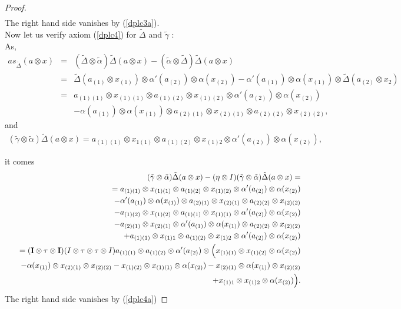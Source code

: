 \documentclass{article}
\theoremstyle{definition}
\theoremstyle{remark}
\numberwithin{equation}{section}
\begin{document}
\begin{proof}
\begin{eqnarray}
\end{eqnarray}
The right hand side vanishes by (\ref{dplc3a}).\\
Now let us verify axiom (\ref{dplc4}) for $\tilde\Delta$ and $\tilde\gamma$ :\\
As,
\begin{eqnarray}
 as_{\tilde\Delta}(a\otimes x)
&=&(\tilde\Delta\otimes \tilde\alpha)\tilde\Delta(a\otimes x)-(\tilde\alpha\otimes\tilde\Delta)\tilde\Delta(a\otimes x)\nonumber\\
&=&\tilde\Delta(a_{(1)}\otimes x_{(1)})\otimes \alpha'(a_{(2)})\otimes \alpha(x_{(2)})-\alpha'(a_{(1)})\otimes \alpha(x_{(1)})\otimes\tilde\Delta(a_{(2)}\otimes x_{2})\nonumber\\
&=&a_{(1)(1)}\otimes x_{(1)(1)}\otimes a_{(1)(2)}\otimes x_{(1)(2)}\otimes\alpha'(a_{(2)})\otimes \alpha(x_{(2)})\nonumber\\
&&-\alpha(a_{(1)})\otimes\alpha(x_{(1)})\otimes a_{(2)(1)}\otimes x_{(2)(1)}\otimes a_{(2)(2)}\otimes x_{(2)(2)}\nonumber,
\end{eqnarray}
and
\begin{eqnarray}
 (\tilde\gamma\otimes \tilde\alpha)\tilde\Delta(a\otimes x)
=a_{(1)(1)}\otimes x_{1(1)}\otimes a_{(1)(2)}\otimes x_{(1)2}\otimes\alpha'(a_{(2)})\otimes \alpha(x_{(2)}),\nonumber
\end{eqnarray}

it comes
\begin{eqnarray}
 &&\qquad(\tilde\gamma\otimes \tilde\alpha)\tilde\Delta(a\otimes x)-(\eta\otimes I)(\tilde\gamma\otimes \tilde\alpha)\tilde\Delta(a\otimes x)=\nonumber\\
&&=a_{(1)(1)}\otimes x_{(1)(1)}\otimes a_{(1)(2)}\otimes x_{(1)(2)}\otimes \alpha'(a_{(2)})\otimes \alpha(x_{(2)})\nonumber\\
&&\quad\quad-\alpha'(a_{(1)})\otimes \alpha(x_{(1)})\otimes a_{(2)(1)}\otimes x_{(2)(1)}\otimes a_{(2)(2)}\otimes x_{(2)(2)}\nonumber\\
&&\quad-a_{(1)(2)}\otimes x_{(1)(2)}\otimes a_{(1)(1)}\otimes x_{(1)(1)}\otimes \alpha'(a_{(2)})\otimes \alpha(x_{(2)})\nonumber\\
&&\quad\quad-a_{(2)(1)}\otimes x_{(2)(1)}\otimes \alpha'(a_{(1)})\otimes \alpha(x_{(1)})\otimes a_{(2)(2)}\otimes x_{(2)(2)}\nonumber\\
&&\quad+a_{(1)(1)}\otimes x_{(1)1}\otimes a_{(1)(2)}\otimes x_{(1)2}\otimes \alpha'(a_{(2)})\otimes \alpha(x_{(2)})\nonumber\\
&&=({\bf I}\otimes\tau\otimes {\bf I})(I\otimes\tau\otimes\tau\otimes I)a_{(1)(1)}\otimes a_{(1)(2)}\otimes \alpha'(a_{(2)})\otimes\Big( 
x_{(1)(1)}\otimes x_{(1)(2)}\otimes \alpha(x_{(2)})\nonumber\\
&&\quad-\alpha(x_{(1)})\otimes x_{(2)(1)}\otimes x_{(2)(2)}-x_{(1)(2)}\otimes x_{(1)(1)}\otimes \alpha(x_{(2)})
-x_{(2)(1)}\otimes \alpha(x_{(1)})\otimes x_{(2)(2)}\nonumber\\
&&\quad+x_{(1)1}\otimes x_{(1)2}\otimes \alpha(x_{(2)})\Big).\nonumber
\end{eqnarray}
The right hand side vanishes by (\ref{dplc4a})
\end{proof}
\end{document}
